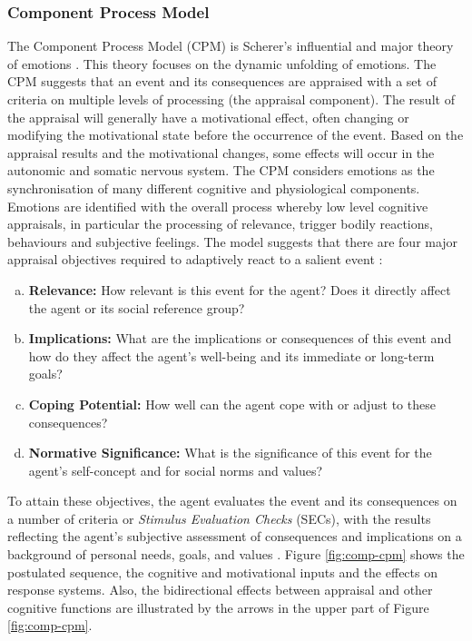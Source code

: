 \documentclass[12pt]{report}
\begin{document}
\subsubsection{Component Process Model}
\label{sec:cpm}

The Component Process Model (CPM) is Scherer's influential and major theory of
emotions
\cite{scherer:sequential-appraisal-process,scherer:appraisal-processes}. This
theory focuses on the dynamic unfolding of emotions. The CPM suggests that an
event and its consequences are appraised with a set of criteria on multiple
levels of processing (the appraisal component). The result of the appraisal will
generally have a motivational effect, often changing or modifying the
motivational state before the occurrence of the event. Based on the appraisal
results and the motivational changes, some effects will occur in the autonomic
and somatic nervous system. The CPM considers emotions as the synchronisation of
many different cognitive and physiological components. Emotions are identified
with the overall process whereby low level cognitive appraisals, in particular
the processing of relevance, trigger bodily reactions, behaviours and subjective
feelings. The model suggests that there are four major appraisal objectives
required to adaptively react to a salient event
\cite{scherer:dynamic-architecture-emotion}:

\begin{enumerate}[a)]
  \item \textbf{Relevance:} How relevant is this event for the agent? Does it
  directly affect the agent or its social reference group?
  \item \textbf{Implications:} What are the implications or consequences of this
  event and how do they affect the agent's well-being and its immediate or
  long-term goals?
  \item \textbf{Coping Potential:} How well can the agent cope with or adjust to
  these consequences?
  \item \textbf{Normative Significance:} What is the significance of this event
  for the agent's self-concept and for social norms and values?
\end{enumerate}

To attain these objectives, the agent evaluates the event and its consequences
on a number of criteria or \textit{Stimulus Evaluation Checks} (SECs), with the
results reflecting the agent’s subjective assessment of consequences and
implications on a background of personal needs, goals, and values
\cite{scherer:appraisal-processes}. Figure \ref{fig:comp-cpm} shows the
postulated sequence, the cognitive and motivational inputs and the effects on
response systems. Also, the bidirectional effects between appraisal and other
cognitive functions are illustrated by the arrows in the upper part of Figure
\ref{fig:comp-cpm}.
\end{document}
